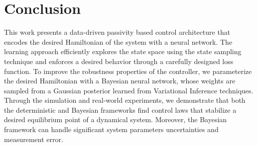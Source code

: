 \section{Conclusion}
\label{sec:conclusion}

This work presents a data-driven passivity based control architecture that encodes
the desired Hamiltonian of the system with a neural network. 
%
The learning approach efficiently explores the state space using the state
sampling technique and enforces a desired behavior through a carefully
designed loss function.
%
To improve the robustness properties of the controller, we parameterize
the desired Hamiltonian with a Bayesian neural network, whose weights are
sampled from a Gaussian posterior learned from Variational Inference techniques.
%
Through the simulation and real-world experiments, we demonstrate that both the
deterministic and Bayesian frameworks find control laws that stabilize a desired
equilibrium point of a dynamical system. 
%
Moreover, the Bayesian framework can handle significant system
parameters uncertainties and measurement error.
